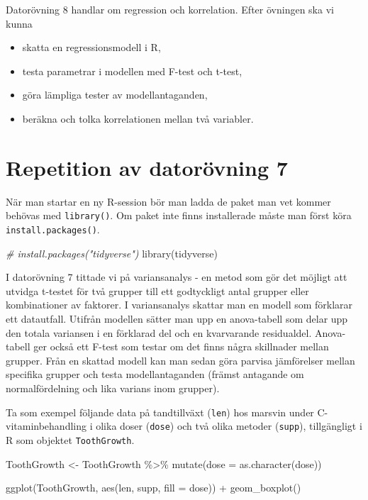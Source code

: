 \documentclass[
]{book}
\newenvironment{Shaded}{\begin{snugshade}}{\end{snugshade}}
\newcommand{\AttributeTok}[1]{\textcolor[rgb]{0.77,0.63,0.00}{#1}}
\newcommand{\CommentTok}[1]{\textcolor[rgb]{0.56,0.35,0.01}{\textit{#1}}}
\newcommand{\FunctionTok}[1]{\textcolor[rgb]{0.00,0.00,0.00}{#1}}
\newcommand{\NormalTok}[1]{#1}
\newcommand{\OtherTok}[1]{\textcolor[rgb]{0.56,0.35,0.01}{#1}}
\newcommand{\SpecialCharTok}[1]{\textcolor[rgb]{0.00,0.00,0.00}{#1}}
\theoremstyle{definition}
\theoremstyle{definition}
\theoremstyle{definition}
\theoremstyle{definition}
\theoremstyle{remark}
\begin{document}
Datorövning 8 handlar om regression och korrelation. Efter övningen ska vi kunna

\begin{itemize}
\item
  skatta en regressionsmodell i R,
\item
  testa parametrar i modellen med F-test och t-test,
\item
  göra lämpliga tester av modellantaganden,
\item
  beräkna och tolka korrelationen mellan två variabler.
\end{itemize}

\hypertarget{repetition-av-datoruxf6vning-7}{%
\section{Repetition av datorövning 7}\label{repetition-av-datoruxf6vning-7}}

När man startar en ny R-session bör man ladda de paket man vet kommer behövas med \texttt{library()}. Om paket inte finns installerade måste man först köra \texttt{install.packages()}.

\begin{Shaded}
\begin{Highlighting}[]
\CommentTok{\# install.packages("tidyverse")}
\FunctionTok{library}\NormalTok{(tidyverse)}
\end{Highlighting}
\end{Shaded}

I datorövning 7 tittade vi på variansanalys - en metod som gör det möjligt att utvidga t-testet för två grupper till ett godtyckligt antal grupper eller kombinationer av faktorer. I variansanalys skattar man en modell som förklarar ett datautfall. Utifrån modellen sätter man upp en anova-tabell som delar upp den totala variansen i en förklarad del och en kvarvarande residualdel. Anova-tabell ger också ett F-test som testar om det finns några skillnader mellan grupper. Från en skattad modell kan man sedan göra parvisa jämförelser mellan specifika grupper och testa modellantaganden (främst antagande om normalfördelning och lika varians inom grupper).

Ta som exempel följande data på tandtillväxt (\texttt{len}) hos marsvin under C-vitaminbehandling i olika doser (\texttt{dose}) och två olika metoder (\texttt{supp}), tillgängligt i R som objektet \texttt{ToothGrowth}.

\begin{Shaded}
\begin{Highlighting}[]
\NormalTok{ToothGrowth }\OtherTok{\textless{}{-}}\NormalTok{ ToothGrowth }\SpecialCharTok{\%\textgreater{}\%} \FunctionTok{mutate}\NormalTok{(}\AttributeTok{dose =} \FunctionTok{as.character}\NormalTok{(dose))}

\FunctionTok{ggplot}\NormalTok{(ToothGrowth, }\FunctionTok{aes}\NormalTok{(len, supp, }\AttributeTok{fill =}\NormalTok{ dose)) }\SpecialCharTok{+} 
  \FunctionTok{geom\_boxplot}\NormalTok{()}
\end{Highlighting}
\end{Shaded}
\end{document}
